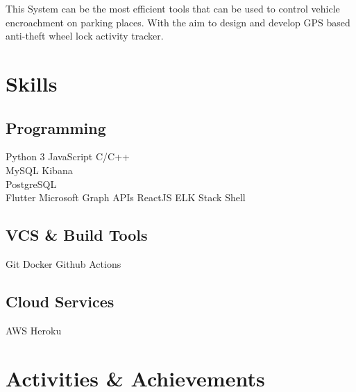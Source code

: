 \documentclass[]{deedy-resume-openfont}
\begin{document}
\begin{minipage}[t]{0.66\textwidth}
\begin{tightemize}
\item This System can be the most efficient tools that can be used to control vehicle encroachment on parking places. With the aim to design and develop GPS based anti-theft wheel lock activity tracker.

\end{tightemize}
\sectionsep


%
%


\end{minipage}%
\hfill
\begin{minipage}[t]{0.33\textwidth} 


\section{Skills}
\subsection{Programming}
Python 3\textbullet{} JavaScript \textbullet{} C/C++ \textbullet{} \\ 
MySQL \textbullet{} Kibana \textbullet{}\\
PostgreSQL \textbullet{}  \\
Flutter \textbullet{} Microsoft Graph APIs \textbullet{}
ReactJS \textbullet{ }ELK Stack\textbullet{} Shell
\subsection{VCS \& Build Tools }
Git \textbullet{} Docker \textbullet{} Github Actions
\subsection{Cloud Services}
AWS \textbullet{} Heroku
\sectionsep


\section{Activities \& Achievements} 


\end{minipage}
\end{document}
